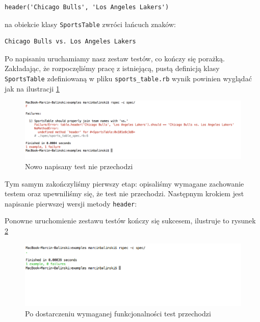 \begin{lstlisting} 
header('Chicago Bulls', 'Los Angeles Lakers')
\end{lstlisting}
    
    na obiekcie klasy \verb+SportsTable+ zwróci łańcuch znaków:
    
\begin{lstlisting} 
Chicago Bulls vs. Los Angeles Lakers
\end{lstlisting}
    
    Po napisaniu uruchamiamy nasz zestaw testów, co kończy się porażką. Zakładając, że rozpoczęliśmy pracę z istniejącą, pustą definicją klasy \verb+SportsTable+ zdefiniowaną w pliku \verb+sports_table.rb+ wynik powinien wyglądać jak na ilustracji \ref{example1_failure}
    
    \vspace{5 mm}
     \begin{figure}[!h]
   		\begin{center}
   			\includegraphics[width=\linewidth]{images/example1_failure.png}
   			\caption{Nowo napisany test nie przechodzi}
   			\label{example1_failure}
   		\end{center}
   	\end{figure}
    
    Tym samym zakończyliśmy pierwszy etap: opisaliśmy wymagane zachowanie testem oraz upewniliśmy się, że test nie przechodzi. Następnym krokiem jest napisanie pierwszej wersji metody \verb+header+:
    
    
    
    Ponowne uruchomienie zestawu testów kończy się sukcesem, ilustruje to rysunek \ref{example1_success}
    
     \clearpage
     
     \begin{figure}[!h]
   		\begin{center}
   			\includegraphics[width=\linewidth]{images/example1_success.png}
   			\caption{Po dostarczeniu wymaganej funkcjonalności test przechodzi}
   			\label{example1_success}
   		\end{center}
   	\end{figure}
    
